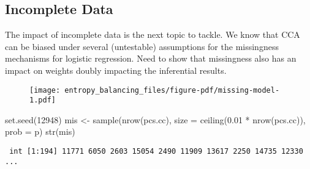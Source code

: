 \documentclass[
  letterpaper,
  DIV=11,
  numbers=noendperiod]{scrartcl}
\newenvironment{Shaded}{\begin{snugshade}}{\end{snugshade}}
\newcommand{\AttributeTok}[1]{\textcolor[rgb]{0.40,0.45,0.13}{#1}}
\newcommand{\DecValTok}[1]{\textcolor[rgb]{0.68,0.00,0.00}{#1}}
\newcommand{\FloatTok}[1]{\textcolor[rgb]{0.68,0.00,0.00}{#1}}
\newcommand{\FunctionTok}[1]{\textcolor[rgb]{0.28,0.35,0.67}{#1}}
\newcommand{\NormalTok}[1]{\textcolor[rgb]{0.00,0.23,0.31}{#1}}
\newcommand{\OtherTok}[1]{\textcolor[rgb]{0.00,0.23,0.31}{#1}}
\newcommand{\SpecialCharTok}[1]{\textcolor[rgb]{0.37,0.37,0.37}{#1}}
\begin{document}
\hypertarget{incomplete-data}{%
\subsection{Incomplete Data}\label{incomplete-data}}

The impact of incomplete data is the next topic to tackle. We know that
CCA can be biased under several (untestable) assumptions for the
missingness mechanisms for logistic regression. Need to show that
missingness also has an impact on weights doubly impacting the
inferential results.

\begin{Shaded}
\end{Shaded}

\begin{figure}[H]

{\centering \texttt{[image: entropy\_balancing\_files/figure-pdf/missing-model-1.pdf]}

}

\end{figure}

\begin{Shaded}
\begin{Highlighting}[]
\FunctionTok{set.seed}\NormalTok{(}\DecValTok{12948}\NormalTok{)}
\NormalTok{mis }\OtherTok{\textless{}{-}} \FunctionTok{sample}\NormalTok{(}\FunctionTok{nrow}\NormalTok{(pcs.cc), }\AttributeTok{size =} \FunctionTok{ceiling}\NormalTok{(}\FloatTok{0.01} \SpecialCharTok{*} \FunctionTok{nrow}\NormalTok{(pcs.cc)), }\AttributeTok{prob =}\NormalTok{ p)}
\FunctionTok{str}\NormalTok{(mis)}
\end{Highlighting}
\end{Shaded}

\begin{verbatim}
 int [1:194] 11771 6050 2603 15054 2490 11909 13617 2250 14735 12330 ...
\end{verbatim}
\end{document}
